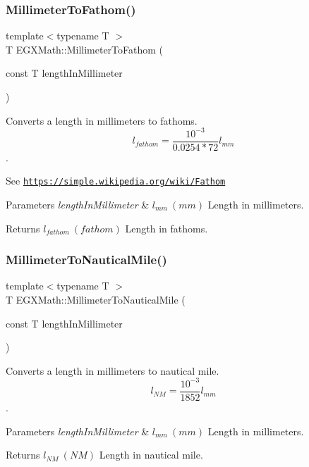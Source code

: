\subsubsection{\texorpdfstring{Millimeter\+To\+Fathom()}{MillimeterToFathom()}}
{\footnotesize\ttfamily template$<$typename T $>$ \\
T E\+G\+X\+Math\+::\+Millimeter\+To\+Fathom (\begin{DoxyParamCaption}\item[{const T}]{length\+In\+Millimeter }\end{DoxyParamCaption})}



Converts a length in millimeters to fathoms. \[ l_{fathom}= \frac{10^{-3}}{0.0254 * 72} l_{mm} \]. 

See \href{https://simple.wikipedia.org/wiki/Fathom}{\tt https\+://simple.\+wikipedia.\+org/wiki/\+Fathom} 
\begin{DoxyParams}{Parameters}
{\em length\+In\+Millimeter} & $ l_{mm}\ (mm)$ Length in millimeters. \\
\hline
\end{DoxyParams}
\begin{DoxyReturn}{Returns}
$ l_{fathom}\ (fathom)$ Length in fathoms. 
\end{DoxyReturn}
\mbox{\label{group___e_g_x_math-_conversions-_length_conversions-_s_i-_millimeter-_nautical_ga05ed5fb1300287763d8927ee90315808}} 
\subsubsection{\texorpdfstring{Millimeter\+To\+Nautical\+Mile()}{MillimeterToNauticalMile()}}
{\footnotesize\ttfamily template$<$typename T $>$ \\
T E\+G\+X\+Math\+::\+Millimeter\+To\+Nautical\+Mile (\begin{DoxyParamCaption}\item[{const T}]{length\+In\+Millimeter }\end{DoxyParamCaption})}



Converts a length in millimeters to nautical mile. \[ l_{NM}= \frac{10^{-3}}{1852} l_{mm} \]. 


\begin{DoxyParams}{Parameters}
{\em length\+In\+Millimeter} & $ l_{mm}\ (mm)$ Length in millimeters. \\
\hline
\end{DoxyParams}
\begin{DoxyReturn}{Returns}
$ l_{NM}\ (NM)$ Length in nautical mile. 
\end{DoxyReturn}
